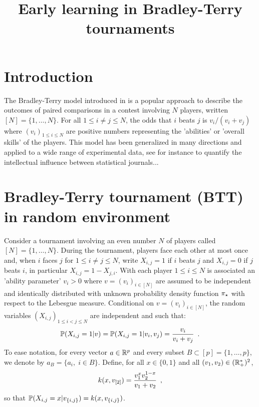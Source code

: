 


\title{Early learning in Bradley-Terry tournaments}
\date{}

\author{}

\lhead{}

\maketitle

\begin{abstract}

\end{abstract}

\section{Introduction}
The Bradley-Terry model introduced in \cite{bradley:terry:1952,zemerlo:1929} is a popular approach to describe the outcomes of paired comparisons in a contest involving $N$ players, written $[N]=\{1,\ldots,N\}$. For all $1\le i \ne j\le N$, the odds that $i$ beats $j$ is $v_i/(v_i+v_j)$ where $(v_i)_{1\le i\le N}$ are positive numbers representing the 'abilities' or 'overall skills' of  the players. This model has been generalized in many directions and applied to a wide range of experimental data, see for instance \cite{stigler:1994} to quantify the intellectual influence between statistical journals...
\cite{hastie:tibshirani:1998}
\cite{hunter:2004}
\section{Bradley-Terry tournament (BTT) in random environment}
Consider a tournament involving an even number $N$ of players called $[N]=\{1,\ldots,N\}$. 
During the tournament, players face each other at most once and, when $i$ faces $j$ for $1\le i \neq j\le N$, write $X_{i,j}=1$ if $i$ beats $j$ and $X_{i,j}=0$ if $j$ beats $i$, in particular $X_{i,j}=1-X_{j,i}$. With each player $1\le i\le N$ is associated an 'ability parameter' $v_i>0$ where $v=(v_i)_{i\in[N]}$ are assumed to be independent and identically distributed with unknown probability density function $\pi_{\star}$ with respect to the Lebesgue measure. Conditional on $v=(v_i)_{i\in[N]}$, the random variables $(X_{i,j})_{1\le i<j\le N}$ are independent and such that:
\[
\mathbb{P}(X_{i,j}=1|v) = \mathbb{P}(X_{i,j}=1|v_i,v_j)=\frac{v_i}{v_i+v_j}\enspace.
\]
To ease notation, for every vector $a\in \mathbb{R}^p$ and every subset $B\subset [p]=\{1,\ldots,p\}$, we denote by $a_{B}=\{a_i,\;i\in B\}$. Define, for all $x\in \{0,1\}$ and all $(v_1,v_2)\in(\mathbb{R}_+^*)^2$, 
\[
k(x,v_{[2]})=\frac{v_1^xv_2^{1-x}}{v_1+v_2}\enspace,
\]
so that $\mathbb{P}(X_{i,j}=x|v_{\{i,j\}})=k(x,v_{\{i,j\}})$. 


